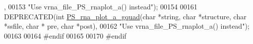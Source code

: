 \begin{DoxyCode}
      ,
00153 \textcolor{stringliteral}{"Use vrna\_file\_PS\_rnaplot\_a() instead"});
00154 
00161 DEPRECATED(\textcolor{keywordtype}{int} \hyperlink{plot__structure_8h_a32fa0f97625119e9d24dd2e7153abc4f}{PS\_rna\_plot\_a\_gquad}(\textcolor{keywordtype}{char} *\textcolor{keywordtype}{string}, \textcolor{keywordtype}{char} *structure, \textcolor{keywordtype}{char} *ssfile, \textcolor{keywordtype}{char} *
      pre, \textcolor{keywordtype}{char} *post),
00162 \textcolor{stringliteral}{"Use vrna\_file\_PS\_rnaplot\_a() instead"});
00163 
00164 \textcolor{preprocessor}{#endif}
00165 
00170 \textcolor{preprocessor}{#endif}
\end{DoxyCode}
